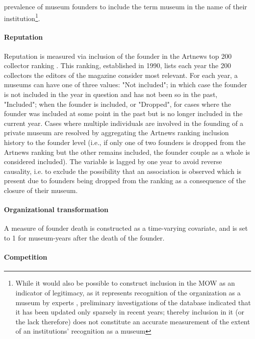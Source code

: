 \documentclass[12pt]{article}
\begin{document}
prevalence of museum founders to include the term museum in the name of their institution\footnote{While it would also be possible to construct inclusion in the MOW as an indicator of legitimacy, as it represents recognition of the organization as a museum by experts \parencite{Zuckerman_1999_illegitimacy}, preliminary investigations of the database indicated that it has been  updated only sparsely in recent years; thereby inclusion in it (or the lack therefore) does not constitute an accurate measurement of the extent of an institutions' recognition as a museum}.




\paragraph*{Reputation}


Reputation is measured via inclusion of the founder in the Artnews top 200 collector ranking \parencite{Artnews_ranking}.
This ranking, established in 1990, lists each year the 200 collectors the editors of the magazine consider most relevant.
For each year, a museums can have one of three values: "Not included"; in which case the founder is not included in the year in question and has not been so in the past, "Included"; when the founder is included, or "Dropped", for cases where the founder was included at some point in the past but is no longer included in the current year.
Cases where multiple individuals are involved in the founding of a private museum are resolved by aggregating the Artnews ranking inclusion history to the founder level (i.e., if only one of two founders is dropped from the Artnews ranking but the other remains included, the founder couple as a whole is considered included).
The variable is lagged by one year to avoid reverse causality, i.e. to exclude the possibility that an association is observed which is present due to founders being dropped from the ranking as a consequence of the closure of their museum.


\paragraph*{Organizational transformation}

A measure of founder death is constructed as a time-varying covariate, and is set to 1 for museum-years after the death of the founder. 

\paragraph*{Competition}
\end{document}

